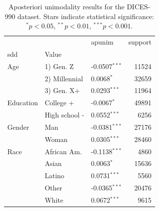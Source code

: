 \begin{table}[t]
\centering
\caption{Aposteriori unimodality results for the DICES-990 dataset. Stars indicate statistical significance: $^{*}p<0.05$, $^{**}p<0.01$, $^{***}p<0.001$.}
\label{tab:dices-990-results}
\begin{tabular}{lllr}
\toprule
 &  & apunim & support \\
\ac{sdd} & Value &  &  \\
\midrule
Age & 1) Gen. Z & -0.0507$^{***}$ & 11524 \\
 & 2) Millennial & 0.0068$^{*}$ & 32659 \\
 & 3) Gen. X+ & 0.0293$^{***}$ & 11964 \\
Education & College + & -0.0067$^{*}$ & 49891 \\
 & High school - & 0.0552$^{***}$ & 6256 \\
Gender & Man & -0.0381$^{***}$ & 27176 \\
 & Woman & 0.0305$^{***}$ & 28460 \\
Race & African Am. & -0.1138$^{***}$ & 4860 \\
 & Asian & 0.0063$^{*}$ & 15636 \\
 & Latino & 0.0731$^{***}$ & 5560 \\
 & Other & -0.0365$^{***}$ & 20476 \\
 & White & 0.0672$^{***}$ & 9615 \\
\bottomrule
\end{tabular}
\end{table}
